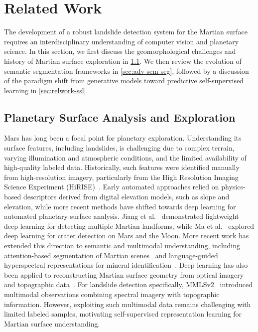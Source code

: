 \section{Related Work}
\label{sec:related-work}
The development of a robust landslide detection system for the Martian surface requires an interdisciplinary understanding of computer vision and planetary science. In this section, we first discuss the geomorphological challenges and history of Martian surface exploration in \cref{sec:planetary}. We then review the evolution of semantic segmentation frameworks in \cref{sec:adv-sem-seg}, followed by a discussion of the paradigm shift from generative models toward predictive self-supervised learning in \cref{sec:relwork-ssl}.

\subsection{Planetary Surface Analysis and Exploration}
\label{sec:planetary}
Mars has long been a focal point for planetary exploration. Understanding its surface features, including landslides, is challenging due to complex terrain, varying illumination and atmospheric conditions, and the limited availability of high-quality labeled data. Historically, such features were identified manually from high-resolution imagery, particularly from the High Resolution Imaging Science Experiment (HiRISE)~\cite{mcewen2007hirise}. Early automated approaches relied on physics-based descriptors derived from digital elevation models, such as slope and elevation, while more recent methods have shifted towards deep learning for automated planetary surface analysis. Jiang et al.~\cite{Jiang2022AutomatedDO} demonstrated lightweight deep learning for detecting multiple Martian landforms, while Ma et al.~\cite{Ma2026DeepLF} explored deep learning for crater detection on Mars and the Moon. More recent work has extended this direction to semantic and multimodal understanding, including attention-based segmentation of Martian scenes~\cite{LIN2026529} and language-guided hyperspectral representations for mineral identification~\cite{Chatterjee_2026_CVPR}. Deep learning has also been applied to reconstructing Martian surface geometry from optical imagery and topographic data~\cite{CAO2025302,rs18142357}. For landslide detection specifically, MMLSv2~\cite{mmlsv2_2026} introduced multimodal observations combining spectral imagery with topographic information. However, exploiting such multimodal data remains challenging with limited labeled samples, motivating self-supervised representation learning for Martian surface understanding.

